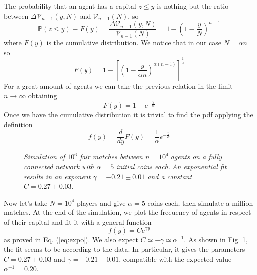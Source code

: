 The probability that an agent has a capital $z \leq y$ is nothing but the ratio between $\Delta\mathcal{V}_{n-1}\left(y, N\right)$ and $\mathcal{V}_{n-1}\left(N\right)$, so
\begin{equation*}
    \mathbb{P}\left(z \leq y\right) \equiv F(y) = \frac{\Delta\mathcal{V}_{n-1}\left(y, N\right)}{\mathcal{V}_{n-1}\left(N\right)} = 1 - \left(1 - \frac{y}{N}\right)^{n-1}
\end{equation*}
where $F(y)$ is the cumulative distribution.
We notice that in our case $N=\alpha n$ so
\begin{equation*}
    F(y) =  1 - \left[\left(1 - \frac{y}{\alpha n}\right)^{\alpha\left(n - 1\right)}\right]^\frac{1}{\alpha}
\end{equation*}
For a great amount of agents we can take the previous relation in the limit $n\to\infty$ obtaining
\begin{equation*}
    F(y) = 1 - e^{-\frac{y}{\alpha}}
\end{equation*}
Once we have the cumulative distribution it is trivial to find the pdf applying the definition
\begin{equation}
    f(y) = \frac{d}{dy}F(y) = \frac{1}{\alpha} e^{-\frac{y}{\alpha}}
    \label{eq:expo}
\end{equation}

\begin{figure}[ht!]
    \centering
    \scalebox{.7}{}
    \caption{\emph{Simulation of $10^6$ fair matches between $n = 10^4$ agents on a fully connected network with $\alpha = 5$ initial coins each. 
                    An exponential fit results in an exponent $\gamma = -0.21 \pm 0.01$ and a constant $C = 0.27 \pm 0.03$.}}
    \label{fig:expo}
\end{figure}
Now let's take $N = 10^4$ players and give $\alpha = 5$ coins each, then simulate a million matches.
At the end of the simulation, we plot the frequency of agents in respect of their capital and fit \cite{root} it with a general function 
\begin{equation}
    f(y) = Ce^{\gamma y}
    \label{eq:generalExpo}
\end{equation}
as proved in Eq. (\ref{eq:expo}).
We  also expect $C \simeq -\gamma \simeq \alpha^{-1}$.
As shown in Fig. \ref{fig:expo}, the fit seems to be according to the data.
In particular, it gives the parameters $C = 0.27 \pm 0.03$ and $\gamma = -0.21 \pm 0.01$, compatible with the expected value $\alpha^{-1} = 0.20$.
